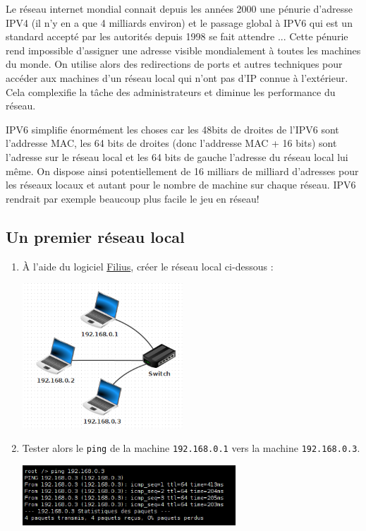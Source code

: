 \documentclass[a4paper,dvipsnames]{article}
\begin{document}
  Le réseau internet mondial connait depuis les années 2000 une pénurie
  d'adresse IPV4 (il n'y en a que 4 milliards environ) et le passage global à
  IPV6 qui est un standard accepté par les autorités depuis 1998 se fait
  attendre ...  Cette pénurie rend impossible d'assigner une adresse visible
  mondialement à toutes les machines du monde. On utilise alors des redirections
  de ports et autres techniques pour accéder aux machines d'un réseau local qui
  n'ont pas d'IP connue à l'extérieur. Cela complexifie la tâche des
  administrateurs et diminue les performance du réseau.

  IPV6 simplifie énormément les choses car les 48bits de droites de l'IPV6 sont
  l'addresse MAC, les 64 bits de droites (donc l'addresse MAC + 16 bits) sont
  l'adresse sur le réseau local et les 64 bits de gauche l'adresse du réseau
  local lui même. On dispose ainsi potentiellement de 16 milliars de milliard
  d'adresses pour les réseaux locaux et autant pour le nombre de machine sur
  chaque réseau. IPV6 rendrait par exemple beaucoup plus facile le jeu en réseau!

\medskip

\subsection{Un premier réseau local}

\begin{activite}[breakable]{}{}
  \begin{enumerate}
    \item À l'aide du logiciel \href{https://www.lernsoftware-filius.de/Herunterladen}{Filius}, créer le réseau local ci-dessous :

      \begin{center}
	\includegraphics[width=6cm]{img/f1.png}
      \end{center}

    \item Tester alors le \texttt{ping} de la machine \texttt{192.168.0.1} vers la machine \texttt{192.168.0.3}.

      \begin{center}
	\includegraphics[width=8cm]{img/ft1.png}
      \end{center}
  \end{enumerate}
\end{activite}
\end{document}
